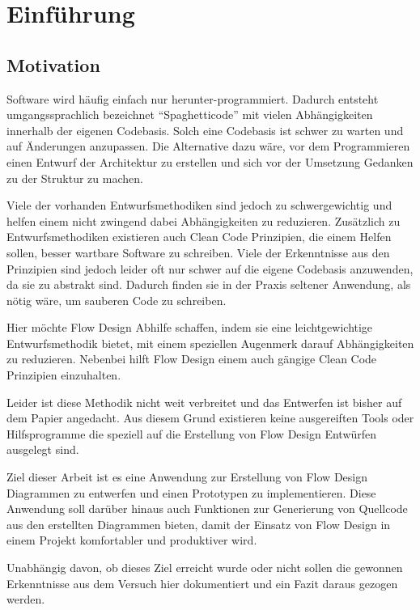 
\chapter{Einführung}

\section{Motivation}

Software wird häufig einfach nur herunter-programmiert. Dadurch entsteht
umgangssprachlich bezeichnet \enquote{Spaghetticode} mit vielen Abhängigkeiten innerhalb
der eigenen Codebasis. Solch eine Codebasis ist schwer zu warten und auf
Änderungen anzupassen. Die Alternative dazu wäre, vor dem Programmieren einen
Entwurf der Architektur zu erstellen und sich vor der Umsetzung Gedanken zu
der Struktur zu machen.

Viele der vorhanden Entwurfsmethodiken sind jedoch zu schwergewichtig und helfen
einem nicht zwingend dabei Abhängigkeiten zu reduzieren.
Zusätzlich zu Entwurfsmethodiken existieren auch Clean Code Prinzipien, die
einem Helfen sollen, besser wartbare Software zu schreiben. Viele der
Erkenntnisse aus den Prinzipien sind jedoch leider oft nur schwer auf die eigene
Codebasis anzuwenden, da sie zu abstrakt sind.
Dadurch finden sie in der Praxis seltener Anwendung, als nötig wäre, um sauberen
Code zu schreiben.

Hier möchte Flow Design Abhilfe schaffen, indem sie eine leichtgewichtige
Entwurfsmethodik bietet, mit einem speziellen Augenmerk darauf Abhängigkeiten
zu reduzieren. Nebenbei hilft Flow Design einem auch gängige Clean Code
Prinzipien einzuhalten. 

Leider ist diese Methodik nicht weit verbreitet und das
Entwerfen ist bisher auf dem Papier angedacht. Aus diesem Grund existieren keine
ausgereiften Tools oder Hilfsprogramme die speziell auf die Erstellung
von Flow Design Entwürfen ausgelegt sind. 

Ziel dieser Arbeit ist es eine Anwendung zur Erstellung von Flow Design Diagrammen 
zu entwerfen und einen Prototypen zu implementieren. Diese Anwendung soll darüber hinaus auch
Funktionen zur Generierung von Quellcode aus den erstellten Diagrammen bieten, damit
der Einsatz von Flow Design in einem Projekt komfortabler und produktiver wird.

Unabhängig davon, ob dieses Ziel erreicht wurde oder nicht sollen die gewonnen
Erkenntnisse aus dem Versuch hier dokumentiert und ein Fazit daraus gezogen werden.


